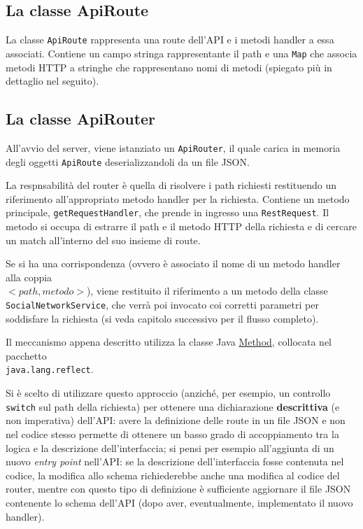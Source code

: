 \documentclass[a4paper,8pt]{article} %
\def\code#1{\texttt{#1}}
\begin{document}
\subsection{La classe ApiRoute}
La classe \code{ApiRoute} rappresenta una route dell'API e i metodi handler a essa associati. Contiene un campo stringa rappresentante il path e una \code{Map}
che associa metodi HTTP a stringhe che rappresentano nomi di metodi (spiegato più in dettaglio nel seguito).

\subsection{La classe ApiRouter}
All'avvio del server, viene istanziato un \code{ApiRouter}, il quale carica in memoria degli oggetti \code{ApiRoute} deserializzandoli da un file JSON.
\par La respnsabilità del router è quella di risolvere i path richiesti restituendo un riferimento all'appropriato metodo handler per la richiesta.
Contiene un metodo principale, \code{getRequestHandler}, che prende in ingresso una \code{RestRequest}.
Il metodo si occupa di estrarre il path e il metodo HTTP della richiesta e di cercare un match all'interno del suo insieme di route.
\par Se si ha una corrispondenza (ovvero è associato il nome di un metodo handler alla coppia\\ $<path, metodo>$),
viene restituito il riferimento a un metodo della classe \code{SocialNetworkService}, che verrà poi invocato coi corretti parametri per
soddisfare la richiesta (si veda capitolo successivo per il flusso completo).
\par Il meccanismo appena descritto utilizza la classe Java \href{https://docs.oracle.com/javase/8/docs/api/java/lang/reflect/Method.html}{Method},
collocata nel pacchetto\\ \code{java.lang.reflect}.
\par Si è scelto di utilizzare questo approccio (anziché, per esempio, un controllo \code{switch} sul path della richiesta) per ottenere una dichiarazione \textbf{descrittiva} (e non imperativa) dell'API:
avere la definizione delle route in un file JSON e non nel codice stesso permette di ottenere un basso grado di accoppiamento tra la logica e la descrizione dell'interfaccia; si pensi per
esempio all'aggiunta di un nuovo \emph{entry point} nell'API: se la descrizione dell'interfaccia fosse contenuta nel codice, la modifica allo schema richiederebbe anche una modifica al codice del router,
mentre con questo tipo di definizione è sufficiente aggiornare il file JSON contenente lo schema dell'API (dopo aver, eventualmente, implementato il nuovo handler).
\end{document}
